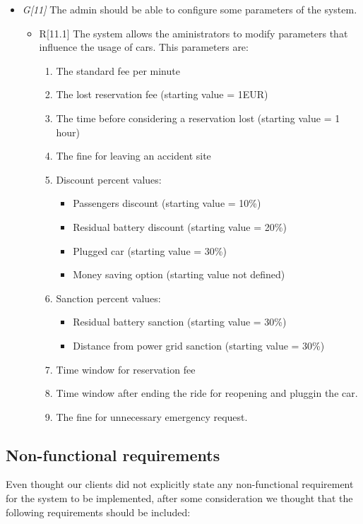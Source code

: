 \begin{itemize}
				\item \textit{G[11]} The admin should be able to configure some parameters of the system.
					\begin{itemize}
						\item R[11.1] The system allows the aministrators to modify parameters that influence the usage of cars. This parameters are:
							\begin{enumerate}
								\item The standard fee per minute
								\item The lost reservation fee (starting value = 1EUR)
								\item The time before considering a reservation lost (starting value = 1 hour)
								\item The fine for leaving an accident site
								\item Discount percent   values:
									\begin{itemize}
										\item Passengers discount (starting value = 10\%)
										\item Residual battery discount (starting value = 20\%)
										\item Plugged car (starting value = 30\%)
										\item Money saving option (starting value not defined)
									\end{itemize}
								\item Sanction percent values:
									\begin{itemize}
										\item Residual battery sanction (starting value = 30\%)
										\item Distance from power grid sanction (starting value = 30\%)
									\end{itemize}
								\item Time window for reservation fee
								\item Time window after ending the ride for reopening and pluggin the car.
								\item The fine for unnecessary emergency request.
							\end{enumerate}
					\end{itemize}
\end{itemize}





\subsection{Non-functional requirements}
	Even thought our clients did not explicitly state any non-functional requirement for the system to be implemented, after some consideration we thought that the following requirements should be included:
	
